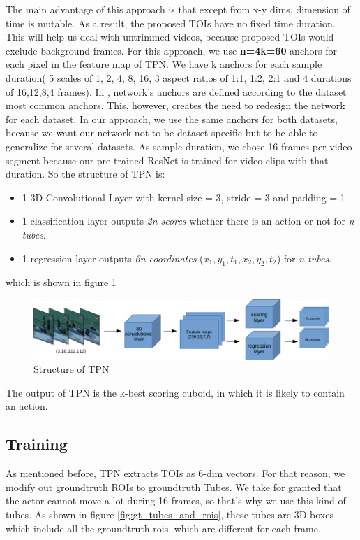 \documentclass{report}
\begin{document}
The main advantage of this approach is that except from x-y dims, dimension of time is mutable. As a result, the proposed TOIs have
no fixed time duration. This will help us deal with untrimmed videos, because proposed TOIs would exclude background frames.
For this approach, we use \textbf{n=4k=60} anchors for each pixel in the feature map of TPN. We have k anchors for each sample
duration( 5 scales of 1, 2, 4, 8, 16, 3 aspect ratios of 1:1, 1:2, 2:1 and 4 durations of 16,12,8,4 frames).
In \cite{DBLP:journals/corr/HouCS17},  network's anchors are defined according to the dataset most common anchors. This, however,
creates the need to redesign the network for each dataset. In our approach, we use the same anchors for both datasets, because we want our network not
to be dataset-specific but to be able to generalize for several datasets. As sample duration, we chose 16 frames per video segment because
our pre-trained ResNet is trained for video clips with that duration.
So the structure of TPN is:
\begin{itemize}
\item 1 3D Convolutional Layer with kernel size = 3, stride = 3 and padding = 1
\item 1 classification layer outputs \textit{2n scores} whether there is an action or not for \textit{n tubes}.
\item 1 regression layer outputs \textit{6n coordinates} ($x_1,y_1,t_1,x_2,y_2,t_2$) for \textit{n tubes}.
\end{itemize}

which is shown in figure \ref{fig:tpn_1_1}
\begin{figure}[h]

  \includegraphics[width=1.\textwidth]{tpn_1_1}
  \caption{Structure of TPN}
  \label{fig:tpn_1_1}
\end{figure}

The output of TPN is the k-best scoring cuboid, in which it is likely to contain an action.


\subsection{Training}
As mentioned before, TPN extracts TOIs as 6-dim vectors. For that reason, we modify out groundtruth ROIs to groundtruth Tubes.
We take for granted that the actor cannot move a lot during 16 frames, so that's why we use this kind of tubes. As shown 
in figure \ref{fig:gt_tubes_and_rois}, these tubes are 3D boxes which include all the groundtruth rois, which are different
for each frame.
\end{document}
